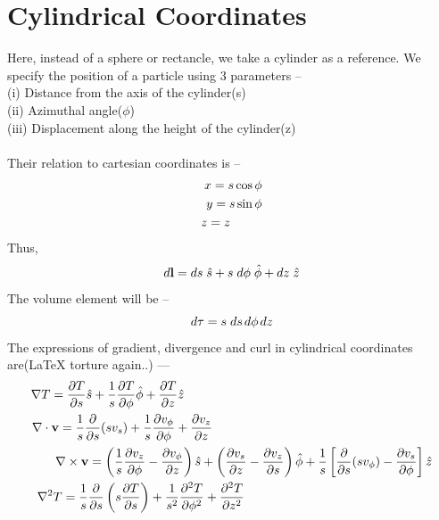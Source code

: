 \documentclass[12pt]{article}
\begin{document}
\section{Cylindrical Coordinates}
Here, instead of a sphere or rectancle, we take a cylinder as a reference. We specify the position of a particle using 3 parameters --\\
(i) Distance from the axis of the cylinder(s)\\
(ii) Azimuthal angle($\phi$)\\
(iii) Displacement along the height of the cylinder(z) \\
\\
Their relation to cartesian coordinates is --
\begin{align}
    x = s\cos\phi \\
    y = s\sin\phi \\
    z = z \hspace{0.9cm}
\end{align}
Thus, 
\begin{equation}
    d\mathbf{l}=ds\hspace{0.1cm}\hat{s}+s\hspace{0.1cm}d\phi\hspace{0.1cm}\hat{\phi}+dz\hspace{0.1cm}\hat{z}
\end{equation}
The volume element will be --
\begin{equation}
    d\tau = s\hspace{0.1cm}ds\hspace{0.05cm}d\phi\hspace{0.05cm}dz
\end{equation}
The expressions of gradient, divergence and curl in cylindrical coordinates are(LaTeX torture again..) ---
\begin{align}
    \nabla T = \frac{\partial T}{\partial s}\hat{s}+\frac{1}{s}\frac{\partial T}{\partial \phi}\hat{\phi}+\frac{\partial T}{\partial z}\hat{z}\hspace{7cm}\\
    \nabla\cdot\mathbf{v} = \frac{1}{s}\frac{\partial}{\partial s}(sv_{s})+\frac{1}{s}\frac{\partial v_{\phi}}{\partial \phi}+\frac{\partial v_z}{\partial z}\hspace{6.2cm}\\
    \nabla\times\mathbf{v} = \left(\frac{1}{s}\frac{\partial v_z}{\partial \phi}-\frac{\partial v_{\phi}}{\partial z}\right)\hat{s}+\left(\frac{\partial v_s}{\partial z}-\frac{\partial v_z}{\partial s}\right)\hat{\phi}+\frac{1}{s}\left[\frac{\partial}{\partial s}(sv_{\phi})-\frac{\partial v_s}{\partial \phi}\right]\hat{z}\\
    \nabla^{2}T = \frac{1}{s}\frac{\partial}{\partial s}\left(s\frac{\partial T}{\partial s}\right)+\frac{1}{s^2}\frac{\partial^2 T}{\partial \phi^2}+\frac{\partial^2 T}{\partial z^2}\hspace{5.3cm}
\end{align}
\end{document}
